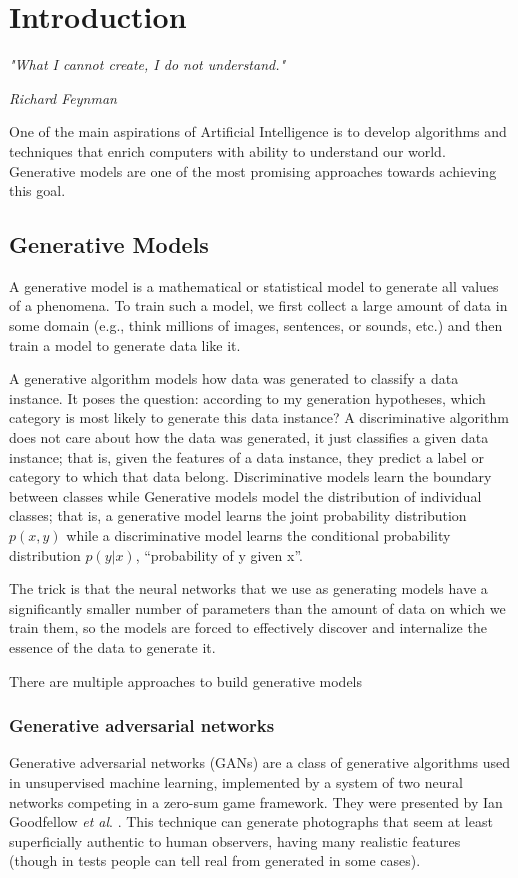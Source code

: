 \chapter{Introduction}\label{ch:introduction}

\epigraph{\normalsize\textit{ "What I cannot create, I do not understand."}}{\normalsize\textit{ Richard Feynman}}

One of the main aspirations of Artificial Intelligence is to develop algorithms and techniques that enrich computers with ability to understand our world. Generative models are one of the most promising approaches towards achieving this goal.\par\bigskip


\section{Generative Models}
\label{sec:gm}
A generative model is a mathematical or statistical model to generate all values of a phenomena. To train such a model, we first collect a large amount of data in some domain (e.g., think millions of images, sentences, or sounds, etc.) and then train a model to generate data like it.\par\bigskip
A generative algorithm models how data was generated to classify a data instance. It poses the question: according to my generation hypotheses, which category is most likely to generate this data instance? A discriminative algorithm does not care about how the data was generated, it just classifies a given data instance; that is, given the features of a data instance, they predict a label or category to which that data belong. Discriminative models learn the boundary between classes while Generative models model the distribution of individual classes; that is, a generative model learns the joint probability distribution $p(x,y)$ while a discriminative model learns the conditional probability distribution $p(y|x)$, “probability of y given x”.\par\bigskip
The trick is that the neural networks that we use as generating models have a significantly smaller number of parameters than the amount of data on which we train them, so the models are forced to effectively discover and internalize the essence of the data to generate it.\par\bigskip
\noindent There are multiple approaches to build generative models
  \subsection{Generative adversarial networks}
  \label{sub:gans}
  Generative adversarial networks (GANs) are a class of generative algorithms used in unsupervised machine learning, implemented by a system of two neural networks competing in a zero-sum game framework. They were presented by Ian Goodfellow \textit{et al}. \cite{gan}. This technique can generate photographs that seem at least superficially authentic to human observers, having many realistic features (though in tests people can tell real from generated in some cases).
